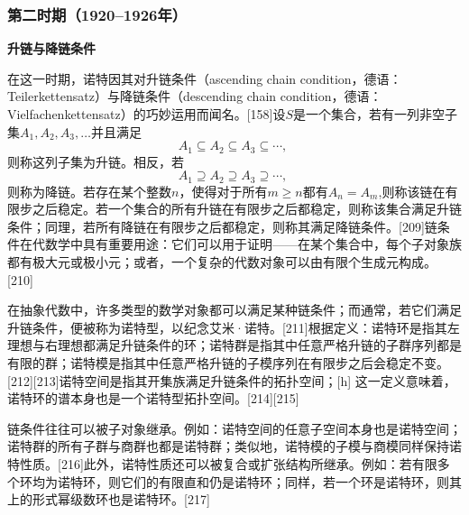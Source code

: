 \subsubsection{第二时期（1920–1926年）}
\textbf{升链与降链条件}

在这一时期，诺特因其对升链条件（ascending chain condition，德语：Teilerkettensatz）与降链条件（descending chain condition，德语：Vielfachenkettensatz）的巧妙运用而闻名。[158]设$S$是一个集合，若有一列非空子集$A_1, A_2, A_3, \ldots$并且满足
$$
A_1 \subseteq A_2 \subseteq A_3 \subseteq \cdots,~
$$
则称这列子集为升链。相反，若
$$
A_1 \supseteq A_2 \supseteq A_3 \supseteq \cdots,~
$$
则称为降链。若存在某个整数$n$，使得对于所有$m \ge n$都有$A_n = A_m$,则称该链在有限步之后稳定。若一个集合的所有升链在有限步之后都稳定，则称该集合满足升链条件；同理，若所有降链在有限步之后都稳定，则称其满足降链条件。[209]链条件在代数学中具有重要用途：它们可以用于证明——在某个集合中，每个子对象族都有极大元或极小元；或者，一个复杂的代数对象可以由有限个生成元构成。[210]

在抽象代数中，许多类型的数学对象都可以满足某种链条件；而通常，若它们满足升链条件，便被称为诺特型，以纪念艾米·诺特。[211]根据定义：诺特环是指其左理想与右理想都满足升链条件的环；诺特群是指其中任意严格升链的子群序列都是有限的群；诺特模是指其中任意严格升链的子模序列在有限步之后会稳定不变。[212][213]诺特空间是指其开集族满足升链条件的拓扑空间；[h] 这一定义意味着，诺特环的谱本身也是一个诺特型拓扑空间。[214][215]

链条件往往可以被子对象继承。例如：诺特空间的任意子空间本身也是诺特空间；诺特群的所有子群与商群也都是诺特群；类似地，诺特模的子模与商模同样保持诺特性质。[216]此外，诺特性质还可以被复合或扩张结构所继承。例如：若有限多个环均为诺特环，则它们的有限直和仍是诺特环；同样，若一个环是诺特环，则其上的形式幂级数环也是诺特环。[217]
